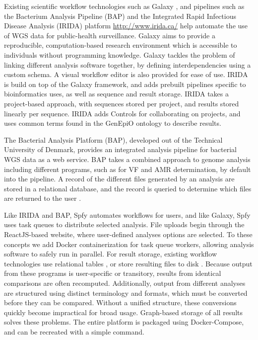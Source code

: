 \documentclass{article}
\begin{document}
Existing scientific workflow technologies such as Galaxy \cite{goecks2010galaxy}, and pipelines such as the Bacterium Analysis Pipeline (BAP) \cite{thomsen2016bacterial} and the Integrated Rapid Infectious Disease Analysis (IRIDA) platform \url{http://www.irida.ca/} help automate the use of WGS data for public-health surveillance.
Galaxy aims to provide a reproducible, computation-based research environment which is accessible to individuals without programming knowledge. Galaxy tackles the problem of linking different analysis software together, by defining interdependencies using a custom schema. A visual workflow editor is also provided for ease of use.
IRIDA is build on top of the Galaxy framework, and adds prebuilt pipelines specific to bioinformatics uses, as well as sequence and result storage. IRIDA takes a project-based approach, with sequences stored per project, and results stored linearly per sequence. IRIDA adds Controls for collaborating on projects, and uses common terms found in the GenEpiO ontology to describe results.

The Bacterial Analysis Platform (BAP), developed out of the Technical University of Denmark, provides an integrated analysis pipeline for bacterial WGS data as a web service.
BAP takes a combined approach to genome analysis including different programs, such as for VF and AMR determination, by default into the pipeline.
A record of the different files generated by an analysis are stored in a relational database, and the record is queried to determine which files are returned to the user \cite{thomsen2016bacterial}.

Like IRIDA and BAP, Spfy automates workflows for users, and like Galaxy, Spfy uses task queues to distribute selected analysis. File uploads begin through the ReactJS-based website, where user-defined analyses options are selected. To these concepts we add Docker containerization for task queue workers, allowing analysis software to safely run in parallel.
For result storage, existing workflow technologies use relational tables \cite{goecks2010galaxy}, or store resulting files to disk \cite{thomsen2016bacterial}.
Because output from these programs is user-specific or transitory, results from identical comparisons are often recomputed. Additionally, output from different analyses are structured using distinct terminology and formats, which must be converted before they can be compared. Without a unified structure, these conversions quickly become impractical for broad usage. Graph-based storage of all results solves these problems.
The entire platform is packaged using Docker-Compose, and can be recreated with a simple command. \par
\end{document}
